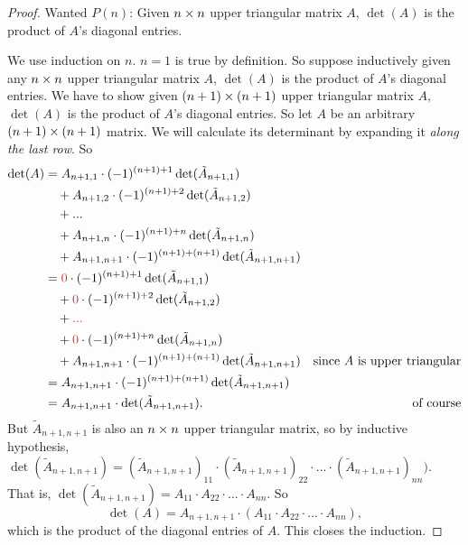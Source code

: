 \begin{proof}
Wanted \(P(n)\): Given \(n \times n\) upper triangular matrix \(A\), \(\det(A)\) is the product of \(A\)'s diagonal entries.

We use induction on \(n\).
\(n = 1\) is true by definition.
So suppose inductively given any \(n \times n\) upper triangular matrix \(A\), \(\det(A)\) is the product of \(A\)'s diagonal entries.
We have to show given \((n + 1) \times (n + 1)\) upper triangular matrix \(A\), \(\det(A)\) is the product of \(A\)'s diagonal entries.
So let \(A\) be an arbitrary \((n + 1) \times (n + 1)\) matrix.
We will calculate its determinant by expanding it \emph{along the last row}.
So
\begin{align*}
    \det(A) & = A_{n+1, 1} \cdot (-1)^{(n+1) + 1} \det(\tilde{A}_{n+1, 1}) \\
            & \quad + A_{n+1, 2} \cdot (-1)^{(n+1) + 2} \det(\tilde{A}_{n+1, 2}) \\
            & \quad + ... \\
            & \quad + A_{n+1, n} \cdot (-1)^{(n+1) + n} \det(\tilde{A}_{n+1, n}) \\
            & \quad + A_{n+1, n+1} \cdot (-1)^{(n+1) + (n+1)} \det(\tilde{A}_{n+1, n+1}) \\
            & = \RED{0} \cdot (-1)^{(n+1) + 1} \det(\tilde{A}_{n+1, 1}) \\
            & \quad + \RED{0} \cdot (-1)^{(n+1) + 2} \det(\tilde{A}_{n+1, 2}) \\
            & \quad + \RED{...} \\
            & \quad + \RED{0} \cdot (-1)^{(n+1) + n} \det(\tilde{A}_{n+1, n}) \\
            & \quad + A_{n+1, n+1} \cdot (-1)^{(n+1) + (n+1)} \det(\tilde{A}_{n+1, n+1}) & \text{since \(A\) is upper triangular} \\
            & = A_{n+1, n+1} \cdot (-1)^{(n+1) + (n+1)} \det(\tilde{A}_{n+1, n+1}) \\
            & = A_{n+1, n+1} \cdot \det(\tilde{A}_{n+1, n+1}). & \text{of course}
\end{align*}
But \(\tilde{A}_{n+1, n+1}\) is also an \(n \times n\) upper triangular matrix, so by inductive hypothesis, \(\det(\tilde{A}_{n+1, n+1}) = (\tilde{A}_{n+1, n+1})_{11} \cdot (\tilde{A}_{n+1, n+1})_{22} \cdot ... \cdot (\tilde{A}_{n+1, n+1})_{nn})\).
That is, \(\det(\tilde{A}_{n+1, n+1}) = A_{11} \cdot A_{22} \cdot ... \cdot A_{nn}\).
So
\[
    \det(A) = A_{n+1, n+1} \cdot (A_{11} \cdot A_{22} \cdot ... \cdot A_{nn}),
\]
which is the product of the diagonal entries of \(A\).
This closes the induction.
\end{proof}

